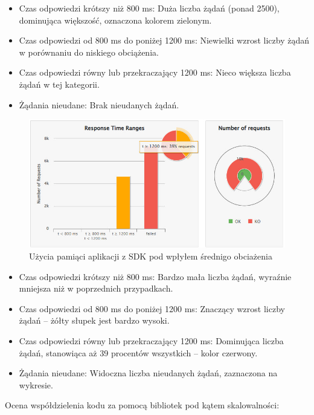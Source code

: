 \documentclass[runningheads,12pt]{llncs}
\begin{document}
\begin{itemize} 
    \item Czas odpowiedzi krótszy niż 800 ms: Duża liczba żądań (ponad 2500), dominująca większość, oznaczona kolorem zielonym. 
    \item Czas odpowiedzi od 800 ms do poniżej 1200 ms: Niewielki wzrost liczby żądań w porównaniu do niskiego obciążenia. 
    \item Czas odpowiedzi równy lub przekraczający 1200 ms: Nieco większa liczba żądań w tej kategorii. 
    \item Żądania nieudane: Brak nieudanych żądań. 
\end{itemize}

\begin{figure}
    \includegraphics[width=\linewidth]{images/library-gatling-high-graph.jpg}
    \caption{Użycia pamiąci aplikacji z SDK pod wpłyłem średnigo obciażenia} \label{fig1}
\end{figure}

\begin{itemize} 
    \item Czas odpowiedzi krótszy niż 800 ms: Bardzo mała liczba żądań, wyraźnie mniejsza niż w poprzednich przypadkach. 
    \item Czas odpowiedzi od 800 ms do poniżej 1200 ms: Znaczący wzrost liczby żądań – żółty słupek jest bardzo wysoki. 
    \item Czas odpowiedzi równy lub przekraczający 1200 ms: Dominująca liczba żądań, stanowiąca aż 39 procentów wszystkich – kolor czerwony. 
    \item Żądania nieudane: Widoczna liczba nieudanych żądań, zaznaczona na wykresie. 
\end{itemize}

\newpage


Ocena współdzielenia kodu za pomocą bibliotek pod kątem skalowalności:
\end{document}
